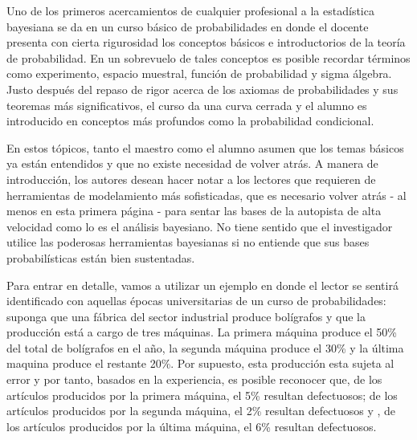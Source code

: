 \documentclass[10pt,openright]{book}\usepackage[]{graphicx}\usepackage[]{color}
\begin{document}
\begin{Eje}

Uno de los primeros acercamientos de cualquier profesional a la estadística bayesiana se da en un curso básico de probabilidades en donde el docente presenta con cierta rigurosidad los conceptos básicos e introductorios de la teoría de probabilidad. En un sobrevuelo de tales conceptos es posible recordar términos como experimento, espacio muestral, función de probabilidad y sigma álgebra. Justo después del repaso de rigor acerca de los axiomas de probabilidades y sus teoremas más significativos, el curso da una curva cerrada y el alumno es introducido en conceptos más profundos como la probabilidad condicional.

En estos tópicos, tanto el maestro como el alumno asumen que los temas básicos ya están entendidos y que no existe necesidad de volver atrás. A manera de introducción, los autores desean hacer notar a los lectores que requieren de herramientas de modelamiento más sofisticadas, que es necesario volver atrás - al menos en esta primera página - para sentar las bases de la autopista de alta velocidad como lo es el análisis bayesiano. No tiene sentido que el investigador utilice las poderosas herramientas bayesianas si no entiende que sus bases probabilísticas están bien sustentadas.

Para entrar en detalle, vamos a utilizar un ejemplo en donde el lector se sentirá identificado con aquellas épocas universitarias de un curso de probabilidades: suponga que una fábrica del sector industrial produce bolígrafos y que la producción está a cargo de tres máquinas. La primera máquina produce el 50\% del total de bolígrafos en el año, la segunda máquina produce el 30\% y la última maquina produce el restante 20\%. Por supuesto, esta producción esta sujeta al error y por tanto, basados en la experiencia, es posible reconocer que, de los artículos producidos por la primera máquina, el 5\% resultan defectuosos; de los artículos producidos por la segunda máquina, el 2\% resultan defectuosos y , de los artículos producidos por la última máquina, el 6\% resultan defectuosos.


\end{Eje}
\end{document}
